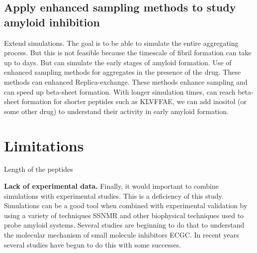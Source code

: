 \subsection{Apply enhanced sampling methods to study amyloid inhibition}
Extend simulations. The goal is to be able to simulate the entire aggregating process.  But this is not feasible because the timescale of fibril formation can take up to days. But can simulate the early stages of amyloid formation.  Use of enhanced sampling methods for aggregates in the presence of the drug.  These methods can enhanced Replica-exchange.  These methods enhance sampling and can speed up beta-sheet formation. With longer simulation times, can reach beta-sheet formation for shorter peptides such as KLVFFAE, we can add inositol (or some other drug) to understand their activity in early amyloid formation.


\section{Limitations}
Length of the peptides

\textbf{Lack of experimental data.} Finally, it would important to combine simulations with experimental studies.  This is a deficiency of this study. Simulations can be a good tool when combined with experimental validation by using a variety of techniques SSNMR and other biophysical techniques used to probe amyloid systems. Several studies are beginning to do that to understand the molecular mechanism of small molecule inhibitors ECGC.  In recent years several studies have begun to do this with some successes.



